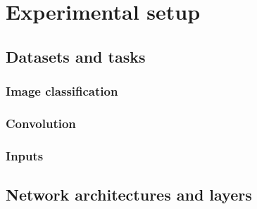 \chapter{Experimental setup}
    \section{Datasets and tasks}
        \subsection{Image classification}
        \subsection{Convolution}
        \subsection{Inputs}
    \section{Network architectures and layers}    